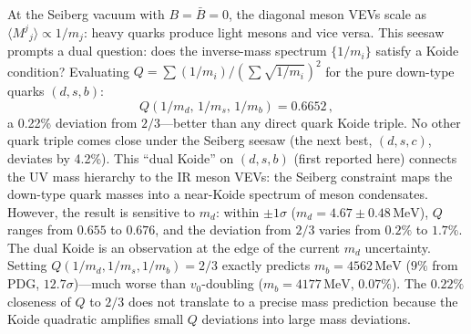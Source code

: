 \documentclass[12pt,a4paper]{article}
\newcommand{\MeV}{\,\text{MeV}}
\begin{document}
At the Seiberg vacuum with $B = \bar B = 0$, the diagonal meson VEVs
scale as $\langle M^j{}_j\rangle \propto 1/m_j$: heavy quarks produce
light mesons and vice versa. This seesaw prompts a dual question: does
the inverse-mass spectrum $\{1/m_i\}$ satisfy a Koide condition?
Evaluating $Q = \sum(1/m_i)/(\sum\sqrt{1/m_i})^2$ for the pure
down-type quarks $(d,s,b)$:
\begin{equation}
  Q(1/m_d,\, 1/m_s,\, 1/m_b) = 0.6652\,,
\end{equation}
a 0.22\% deviation from $2/3$---better than any direct quark Koide
triple. No other quark triple comes close under
the Seiberg seesaw (the next best, $(d,s,c)$, deviates by 4.2\%).
This ``dual Koide'' on $(d,s,b)$ (first reported here) connects
the UV mass hierarchy to the IR meson VEVs: the Seiberg constraint
maps the down-type quark masses into a near-Koide spectrum of
meson condensates. However, the
result is sensitive to $m_d$: within $\pm 1\sigma$ ($m_d = 4.67
\pm 0.48\MeV$), $Q$ ranges from $0.655$ to $0.676$, and the deviation
from $2/3$ varies from $0.2\%$ to $1.7\%$. The dual Koide is an
observation at the edge of the current $m_d$ uncertainty.
Setting $Q(1/m_d,1/m_s,1/m_b) = 2/3$ exactly predicts
$m_b = 4562\MeV$ ($9\%$ from PDG, $12.7\sigma$)---much worse
than $v_0$-doubling ($m_b = 4177\MeV$, $0.07\%$).  The $0.22\%$
closeness of $Q$ to $2/3$ does not translate to a precise mass
prediction because the Koide quadratic amplifies small $Q$
deviations into large mass deviations.
\end{document}
